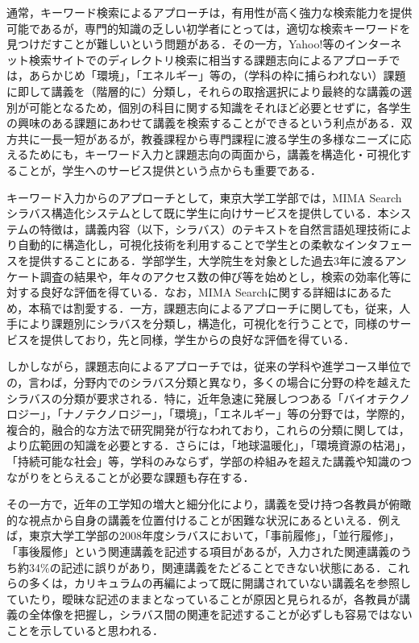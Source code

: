 \documentclass[japanese]{jnlp_1.4}
\begin{document}
通常，キーワード検索によるアプローチは，有用性が高く強力な検索能力を提供可能であるが，専門的知識の乏しい初学者にとっては，適切な検索キーワードを見つけだすことが難しいという問題がある．その一方，Yahoo!等のインターネット検索サイトでのディレクトリ検索に相当する課題志向によるアプローチでは，あらかじめ「環境」，「エネルギー」等の，（学科の枠に捕らわれない）課題に即して講義を（階層的に）分類し，それらの取捨選択により最終的な講義の選別が可能となるため，個別の科目に関する知識をそれほど必要とせずに，各学生の興味のある課題にあわせて講義を検索することができるという利点がある．双方共に一長一短があるが，教養課程から専門課程に渡る学生の多様なニーズに応えるためにも，キーワード入力と課題志向の両面から，講義を構造化・可視化することが，学生へのサービス提供という点からも重要である．

キーワード入力からのアプローチとして，東京大学工学部では，MIMA Searchシラバス構造化システムとして既に学生に向けサービスを提供している．本システムの特徴は，講義内容（以下，シラバス）のテキストを自然言語処理技術により自動的に構造化し，可視化技術を利用することで学生との柔軟なインタフェースを提供することにある．学部学生，大学院生を対象とした過去3年に渡るアンケート調査の結果や，年々のアクセス数の伸び等を始めとし，検索の効率化等に対する良好な評価を得ている．なお，MIMA Searchに関する詳細は\cite{Inproc_Mima_2006a,Web_MIMA_Search}にあるため，本稿では割愛する．一方，課題志向によるアプローチに関しても，従来，人手により課題別にシラバスを分類し，構造化，可視化を行うことで，同様のサービスを提供しており，先と同様，学生からの良好な評価を得ている．

しかしながら，課題志向によるアプローチでは，従来の学科や進学コース単位での，言わば，分野内でのシラバス分類と異なり，多くの場合に分野の枠を越えたシラバスの分類が要求される．特に，近年急速に発展しつつある「バイオテクノロジー」，「ナノテクノロジー」，「環境」，「エネルギー」等の分野では，学際的，複合的，融合的な方法で研究開発が行なわれており，これらの分類に関しては，より広範囲の知識を必要とする．さらには，「地球温暖化」，「環境資源の枯渇」，「持続可能な社会」等，学科のみならず，学部の枠組みを超えた講義や知識のつながりをとらえることが必要な課題も存在する．

その一方で，近年の工学知の増大と細分化により，講義を受け持つ各教員が俯瞰的な視点から自身の講義を位置付けることが困難な状況にあるといえる．例えば，東京大学工学部の2008年度シラバスにおいて，「事前履修」，「並行履修」，「事後履修」という関連講義を記述する項目があるが，入力された関連講義のうち約34\%の記述に誤りがあり，関連講義をたどることできない状態にある．これらの多くは，カリキュラムの再編によって既に開講されていない講義名を参照していたり，曖昧な記述のままとなっていることが原因と見られるが，各教員が講義の全体像を把握し，シラバス間の関連を記述することが必ずしも容易ではないことを示していると思われる．
\end{document}
